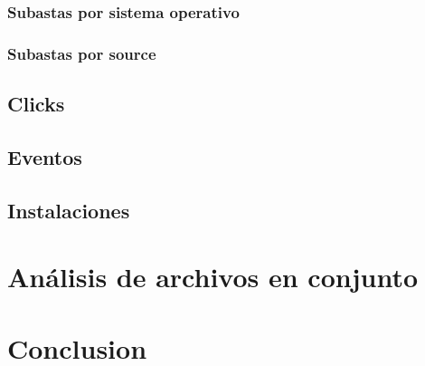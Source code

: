 \documentclass{article}
\begin{document}
	\subsubsection{Subastas por sistema operativo}
	\subsubsection{Subastas por source}
	

\subsection{Clicks}

\subsection{Eventos}

\subsection{Instalaciones}

\section{Análisis de archivos en conjunto}

\section{Conclusion}




\end{document}

